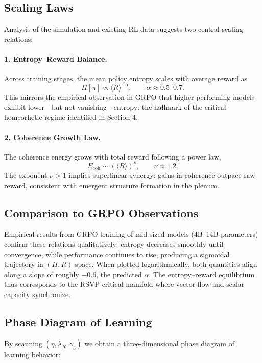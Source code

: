 \documentclass[11pt]{article}
\begin{document}
\subsection{Scaling Laws}

Analysis of the simulation and existing RL data suggests two central scaling relations:

\paragraph{1. Entropy–Reward Balance.}
Across training stages, the mean policy entropy scales with average reward as
\[
H[\pi] \propto \langle R\rangle^{-\alpha},
\qquad
\alpha \approx 0.5\text{–}0.7.
\]
This mirrors the empirical observation in GRPO that higher-performing models exhibit lower—but not vanishing—entropy: the hallmark of the critical homeorhetic regime identified in Section 4.

\paragraph{2. Coherence Growth Law.}
The coherence energy grows with total reward following a power law,
\[
E_{\mathrm{coh}} \sim (\langle R\rangle)^{\nu},
\qquad
\nu \approx 1.2.
\]
The exponent $\nu>1$ implies superlinear synergy: gains in coherence outpace raw reward, consistent with emergent structure formation in the plenum.

\subsection{Comparison to GRPO Observations}

Empirical results from GRPO training of mid-sized models (4B–14B parameters) confirm these relations qualitatively:
entropy decreases smoothly until convergence, while performance continues to rise, producing a sigmoidal trajectory in $(H,R)$ space.  
When plotted logarithmically, both quantities align along a slope of roughly $-0.6$, the predicted $\alpha$.  
The entropy–reward equilibrium thus corresponds to the RSVP critical manifold where vector flow and scalar capacity synchronize.

\subsection{Phase Diagram of Learning}

By scanning $(\eta,\lambda_R,\gamma_3)$ we obtain a three-dimensional phase diagram of learning behavior:
\end{document}
